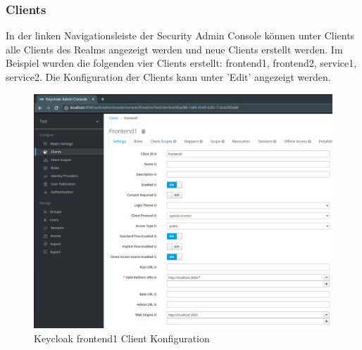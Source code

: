 \subsubsection{Clients}

In der linken Navigationsleiste der Security Admin Console können unter Clients alle Clients des Realms angezeigt werden und neue Clients erstellt werden. Im Beispiel wurden die folgenden vier Clients erstellt: frontend1, frontend2, service1, service2. Die Konfiguration der Clients kann unter 'Edit' angezeigt werden.

\begin{figure}[!ht]
	\centering
	\includegraphics[width=1\textwidth]{Images/Ebert/KeycloakClientConfig.PNG}
	\caption{Keycloak frontend1 Client Konfiguration}
	\label{fig:EB_Keycloak frontend1 Client Konfiguration}
\end{figure}

